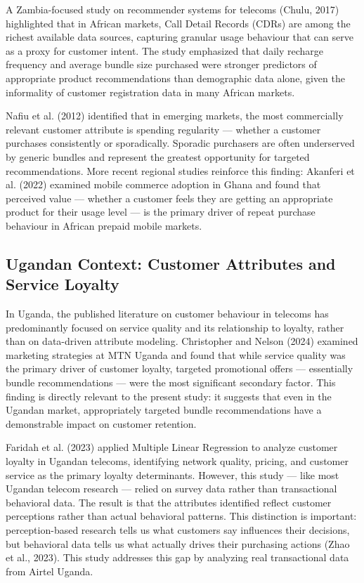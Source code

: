 A Zambia-focused study on recommender systems for telecoms (Chulu, 2017) highlighted that in African markets, Call Detail Records (CDRs) are among the richest available data sources, capturing granular usage behaviour that can serve as a proxy for customer intent. The study emphasized that daily recharge frequency and average bundle size purchased were stronger predictors of appropriate product recommendations than demographic data alone, given the informality of customer registration data in many African markets.

Nafiu et al. (2012) identified that in emerging markets, the most commercially relevant customer attribute is spending regularity --- whether a customer purchases consistently or sporadically. Sporadic purchasers are often underserved by generic bundles and represent the greatest opportunity for targeted recommendations. More recent regional studies reinforce this finding: Akanferi et al. (2022) examined mobile commerce adoption in Ghana and found that perceived value --- whether a customer feels they are getting an appropriate product for their usage level --- is the primary driver of repeat purchase behaviour in African prepaid mobile markets.


\subsection{Ugandan Context: Customer Attributes and Service Loyalty}

In Uganda, the published literature on customer behaviour in telecoms has predominantly focused on service quality and its relationship to loyalty, rather than on data-driven attribute modeling. Christopher and Nelson (2024) examined marketing strategies at MTN Uganda and found that while service quality was the primary driver of customer loyalty, targeted promotional offers --- essentially bundle recommendations --- were the most significant secondary factor. This finding is directly relevant to the present study: it suggests that even in the Ugandan market, appropriately targeted bundle recommendations have a demonstrable impact on customer retention.

Faridah et al. (2023) applied Multiple Linear Regression to analyze customer loyalty in Ugandan telecoms, identifying network quality, pricing, and customer service as the primary loyalty determinants. However, this study --- like most Ugandan telecom research --- relied on survey data rather than transactional behavioral data. The result is that the attributes identified reflect customer perceptions rather than actual behavioral patterns. This distinction is important: perception-based research tells us what customers say influences their decisions, but behavioral data tells us what actually drives their purchasing actions (Zhao et al., 2023). This study addresses this gap by analyzing real transactional data from Airtel Uganda.


